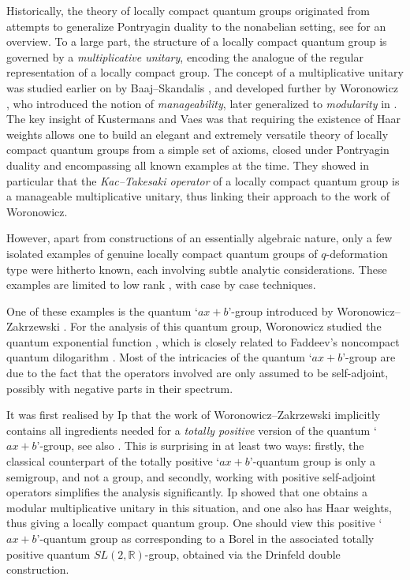 \documentclass[11pt, reqno]{amsart}
\theoremstyle{definition}
\numberwithin{equation}{section}
\def\R{\mathbb R}
\begin{document}
Historically, the theory of locally compact quantum groups originated from attempts to generalize Pontryagin duality to the nonabelian setting, see \cite{Kus05} for an overview. To a large part, the structure of a locally compact quantum group is governed by a \emph{multiplicative unitary}, encoding the analogue of the regular representation of a locally compact group. The concept of a multiplicative unitary was studied earlier on by Baaj--Skandalis \cite{BS93}, and developed further by Woronowicz \cite{Wor96}, who introduced the notion of \emph{manageability}, later generalized to \emph{modularity} in \cite{SW01}. The key insight of Kustermans and Vaes was that requiring the existence of Haar weights allows one to build an elegant and extremely versatile theory of locally compact quantum groups from a simple set of axioms, closed under Pontryagin duality and encompassing all known examples at the time. They showed in particular that the \emph{Kac--Takesaki operator} of a locally compact quantum group is a manageable multiplicative unitary, thus linking their approach to the work of Woronowicz.  

However, apart from constructions of an essentially algebraic nature, only a few isolated examples of genuine locally compact quantum groups of $q$-deformation type were hitherto known, each involving subtle analytic considerations. These examples are limited to low rank \cite{VD01,WZ02,Wor03,KK03}, with case by case techniques. 

One of these examples is the quantum `$ax + b$'-group introduced by Woronowicz--Zakrzewski \cite{WZ02}.  For the analysis of this quantum group, Woronowicz studied the quantum exponential function \cite{Wor00}, which is closely related to Faddeev's noncompact quantum dilogarithm \cite{Fad95, Kas01, FG09}. Most of the intricacies of the quantum `$ax + b$'-group are due to the fact that the operators involved are only assumed to be self-adjoint, possibly with negative parts in their spectrum. 

It was first realised by Ip \cite{Ip13} that the work of Woronowicz--Zakrzewski implicitly contains all ingredients needed for a \emph{totally positive} version of the quantum `$ax + b$'-group, see also \cite{BT03}. This is surprising in at least two ways: firstly, the classical counterpart of the totally positive `$ax + b$'-quantum group is only a semigroup, and not a group, and secondly, working with positive self-adjoint operators simplifies the analysis significantly. Ip showed that one obtains a modular multiplicative unitary in this situation, and one also has Haar weights, thus giving a locally compact quantum group. One should view this positive `$ax+b$'-quantum group as corresponding to a Borel in the associated totally positive quantum $SL(2, \R) $-group, obtained via the Drinfeld double construction. 
\end{document}
